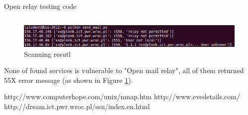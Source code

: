 \documentclass[a4paper, 11pt]{article}
\begin{document}
\begin{listing}[!htb]    
\caption{Open relay testing code}    
\inputminted[mathescape, fontfamily=tt, frame=leftline,framerule=0.4pt,framesep=2mm]{python}{scripts/check_servers.py}
\label{lst:scan_mail}    
\end{listing}

\begin{figure}[!htb]
  \centering
      \includegraphics[width=1\textwidth]{screenshots/send_mail}
  \caption{Scanning resutl}
  \label{fig:mail_scan_result}    
\end{figure}

None of found services is vulnerable to "Open mail relay", all of them returned 55X error message (as shown in Figure \ref{fig:mail_scan_result}).


\begin{thebibliography}{9}

 http://www.computerhope.com/unix/nmap.htm
  http://www.cvedetails.com/
 http://dream.ict.pwr.wroc.pl/ssn/index.en.html

\end{thebibliography}
\end{document}
